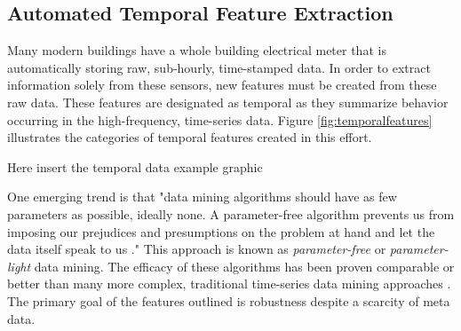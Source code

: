 \subsection{Automated Temporal Feature Extraction}
Many modern buildings have a whole building electrical meter that is automatically storing raw, sub-hourly, time-stamped data. In order to extract information solely from these sensors, new features must be created from these raw data.  These features are designated as temporal as they summarize behavior occurring in the high-frequency, time-series data. Figure \ref{fig:temporalfeatures} illustrates the categories of temporal features created in this effort.

Here insert the temporal data example graphic

One emerging trend is that "data mining algorithms should have as few parameters as possible, ideally none. A parameter-free algorithm prevents us from imposing our prejudices and presumptions on the problem at hand and let the data itself speak to us \cite{Keogh_2004}." This approach is known as \emph{parameter-free} or \emph{parameter-light} data mining. The efficacy of these algorithms has been proven comparable or better than many more complex, traditional time-series data mining approaches \cite{Keogh_2004}. The primary goal of the features outlined is robustness despite a scarcity of meta data.